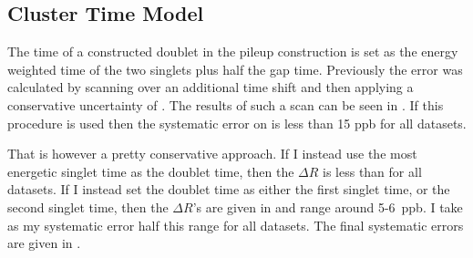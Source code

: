 \clearpage
\subsection{Cluster Time Model}

The time of a constructed doublet in the pileup construction is set as the energy weighted time of the two singlets plus half the gap time. Previously the error was calculated by scanning over an additional time shift and then applying a conservative uncertainty of . The results of such a scan can be seen in . If this procedure is used then the systematic error on \R is less than 15 ppb for all datasets.

That is however a pretty conservative approach. If I instead use the most energetic singlet time as the doublet time, then the $\Delta R$ is less than  for all datasets. If I instead set the doublet time as either the first singlet time, or the second singlet time, then the $\Delta R$'s are given in  and range around 5-6~ppb. I take as my systematic error half this range for all datasets. The final systematic errors are given in .



